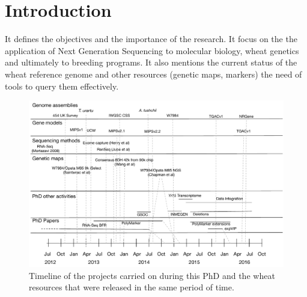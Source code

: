 
\chapter{Introduction}

It defines the objectives and the importance of the research. It focus on the the application of Next Generation Sequencing to molecular biology, wheat genetics and ultimately to breeding programs. It also mentions the current status of the wheat reference genome and other resources (genetic maps, markers) the need of tools to query them effectively. 

\begin{landscape}
 \begin{figure}
  \centering
  \includegraphics[height=0.9\textheight]{Introduction/RicardoPhdTimelineV1.pdf}
  \caption{Timeline of the projects carried on during this PhD and the wheat resources that were released in the same period of time. }
  \label{fig:intro:timeline}
 \end{figure}
\end{landscape}